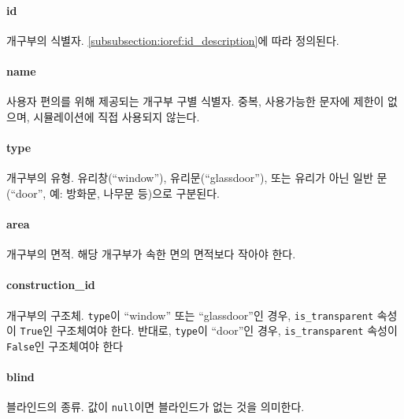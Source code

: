 
\paragraph{id} 개구부의 식별자. \ref{subsubsection:ioref:id_description}에 따라 정의된다.

\paragraph{name} 사용자 편의를 위해 제공되는 개구부 구별 식별자. 중복, 사용가능한 문자에 제한이 없으며, 시뮬레이션에 직접 사용되지 않는다.

\paragraph{type} 개구부의 유형. 유리창(``window''), 유리문(``glassdoor''), 또는 유리가 아닌 일반 문(``door'', 예: 방화문, 나무문 등)으로 구분된다.

\paragraph{area} 개구부의 면적. 해당 개구부가 속한 면의 면적보다 작아야 한다.

\paragraph{construction\_id} 개구부의 구조체. \texttt{type}이 ``window'' 또는 ``glassdoor''인 경우, \texttt{is\_transparent} 속성이 \texttt{True}인 구조체여야 한다. 반대로, \texttt{type}이 ``door''인 경우, \texttt{is\_transparent} 속성이 \texttt{False}인 구조체여야 한다

\paragraph{blind} 블라인드의 종류. 값이 \texttt{null}이면 블라인드가 없는 것을 의미한다.

